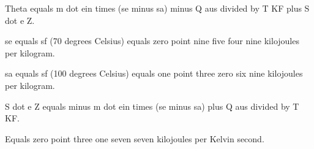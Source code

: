 Theta equals m dot ein times (se minus sa) minus Q aus divided by T KF plus S dot e Z.

se equals sf (70 degrees Celsius) equals zero point nine five four nine kilojoules per kilogram.

sa equals sf (100 degrees Celsius) equals one point three zero six nine kilojoules per kilogram.

S dot e Z equals minus m dot ein times (se minus sa) plus Q aus divided by T KF.

Equals zero point three one seven seven kilojoules per Kelvin second.